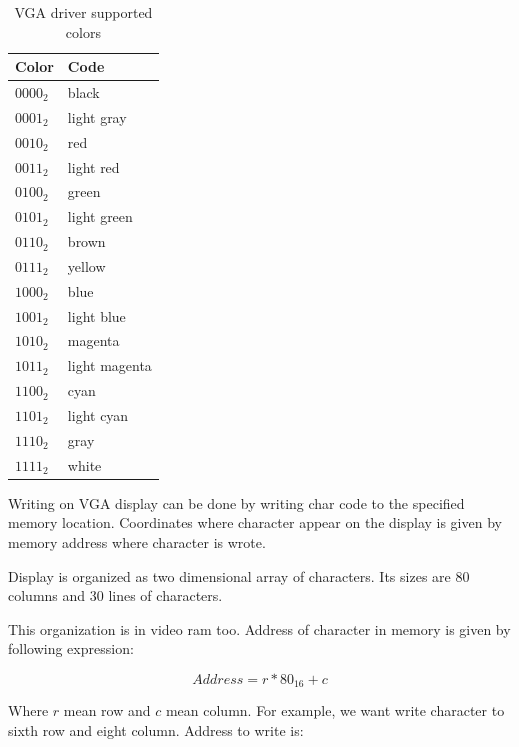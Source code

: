 \begin{table}[h]
    \centering
    \begin{tabular}{|l|l|}
        \hline
        \textbf{Color} & \textbf{Code}  \\ \hline
        $0000_{2}$     & black          \\ \hline
        $0001_{2}$     & light gray     \\ \hline
        $0010_{2}$     & red            \\ \hline
        $0011_{2}$     & light red      \\ \hline
        $0100_{2}$     & green          \\ \hline
        $0101_{2}$     & light green    \\ \hline
        $0110_{2}$     & brown          \\ \hline
        $0111_{2}$     & yellow         \\ \hline
        $1000_{2}$     & blue           \\ \hline
        $1001_{2}$     & light blue     \\ \hline
        $1010_{2}$     & magenta        \\ \hline
        $1011_{2}$     & light magenta  \\ \hline
        $1100_{2}$     & cyan           \\ \hline
        $1101_{2}$     & light cyan     \\ \hline
        $1110_{2}$     & gray           \\ \hline
        $1111_{2}$     & white          \\ \hline
    \end{tabular}
    \caption{VGA driver supported colors}
    \label{tab:vga_collors_codes}
\end{table}

Writing on VGA display can be done by writing char code to the specified memory
location. Coordinates where character appear on the display is given by memory
address where character is wrote.

Display is organized as two dimensional array of characters. Its sizes are 80
columns and 30 lines of characters.

This organization is in video ram too. Address of character in memory is given
by following expression:

$$
    Address = r * 80_{16} + c
$$

Where $r$ mean row and $c$ mean column. For example, we want write character to
sixth row and eight column. Address to write is:

